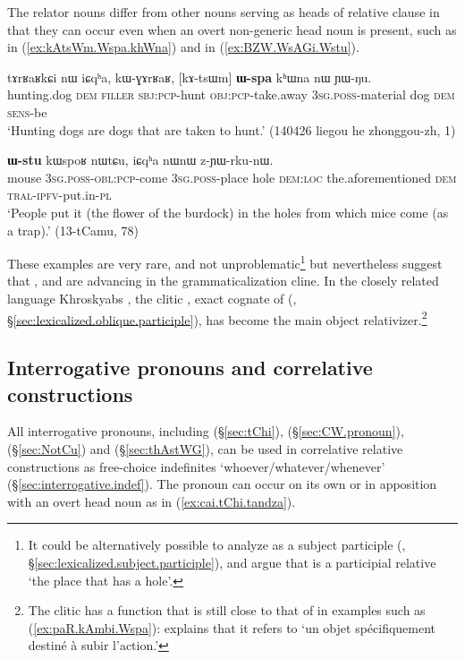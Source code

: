 The relator nouns differ from other nouns serving as heads of relative clause in that they can occur even when an overt non-generic head noun is present, such as  in (\ref{ex:kAtsWm.Wspa.khWna}) and  in (\ref{ex:BZW.WsAGi.Wstu}). 

 \begin{exe}
\ex \label{ex:kAtsWm.Wspa.khWna} 
\gll  tɤrʁaʁkɕi nɯ iɕqʰa, kɯ-ɣɤrʁaʁ, [kɤ-tsɯm] \textbf{ɯ-spa} kʰɯna nɯ ɲɯ-ŋu. \\
hunting.dog \textsc{dem} \textsc{filler} \textsc{sbj}:\textsc{pcp}-hunt \textsc{obj}:\textsc{pcp}-take.away \textsc{3sg}.\textsc{poss}-material dog \textsc{dem} \textsc{sens}-be \\
\glt `Hunting dogs are dogs that are taken to hunt.' (140426 liegou he zhonggou-zh, 1)
\end{exe}  

 \begin{exe}
\ex \label{ex:BZW.WsAGi.Wstu} 
\gll  [βʑɯ ɯ-sɤ-ɣi] \textbf{ɯ-stu} kɯspoʁ nɯtɕu, iɕqʰa nɯnɯ z-ɲɯ-rku-nɯ. \\
mouse \textsc{3sg}.\textsc{poss}-\textsc{obl}:\textsc{pcp}-come \textsc{3sg}.\textsc{poss}-place hole \textsc{dem}:\textsc{loc} the.aforementioned \textsc{dem} \textsc{tral}-\textsc{ipfv}-put.in-\textsc{pl} \\
\glt `People put it (the flower of the burdock) in the holes from which mice come (as a trap).' (13-tCamu, 78)
\end{exe}  
  
These examples are very rare, and not unproblematic\footnote{It could be alternatively possible to analyze  as a subject participle   (, §\ref{sec:lexicalized.subject.participle}), and argue that  is a participial relative `the place that has a hole'. }  but nevertheless suggest that ,  and  are advancing in the grammaticalization cline.   In the closely related language Khroskyabs \citep[580]{lai17khroskyabs}, the clitic , exact cognate of   (, §\ref{sec:lexicalized.oblique.participle}), has become the main object relativizer.\footnote{The clitic  has a function that is still close to that of  in examples such as (\ref{ex:paR.kAmbi.Wspa}):   \citet[514]{lai17khroskyabs} explains that it refers to `un objet spécifiquement destiné à subir l’action.'  }
 
  
\subsection{Interrogative pronouns and correlative constructions} \label{sec:interrogative.relative}
All interrogative pronouns, including   (§\ref{sec:tChi}),  (§\ref{sec:CW.pronoun}),   (§\ref{sec:NotCu}) and  (§\ref{sec:thAstWG}), can be used in correlative relative constructions as free-choice indefinites `whoever/whatever/whenever' (§\ref{sec:interrogative.indef}). The pronoun can occur on its own or in apposition with an overt head noun as in (\ref{ex:cai.tChi.tandza}).


